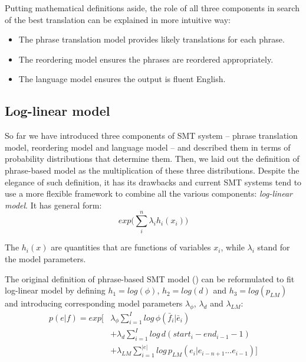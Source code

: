Putting mathematical definitions aside, the role of all three components in search of
the best translation can be explained in more intuitive way:
\begin{itemize}
  \item The phrase translation model provides likely translations for each phrase.
  \item The reordering model ensures the phrases are reordered appropriately.
  \item The language model ensures the output is fluent English.
\end{itemize}


\subsection{Log-linear model}

So far we have introduced three components of SMT system -- phrase translation model,
reordering model and language model -- and described them in terms of probability
distributions that determine them.
Then, we laid out the definition of phrase-based model as the multiplication of these
three distributions.
Despite the elegance of such definition, it has its drawbacks and current SMT
systems tend to use a more flexible framework to combine all the various
components: \emph{log-linear model}.
It has general form:
\begin{equation}
  exp \Big( \sum_i^n \lambda_i h_i(x_i) \Big)
\end{equation}

The $h_i(x)$ are quantities that are functions of variables $x_i$,
while $\lambda_i$ stand for the model parameters.

The original definition of phrase-based SMT model () can be reformulated to
fit log-linear model by defining $h_1 = log(\phi)$, $h_2 = log(d)$ and $h_3 = log(p_{LM})$
and introducing corresponding model parameters $\lambda_{\phi}$, $\lambda_{d}$ and $\lambda_{LM}$:
\begin{equation}
  \begin{aligned}
  p(e|f) = exp \Bigg[ &\lambda_{\phi} \sum_{i=1}^I log \, \phi(\bar{f}_i|\bar{e}_i) \\
       &+ \lambda_{d} \sum_{i=1}^{I} log \, d(start_i - end_{i-1} - 1) \\
       &+ \lambda_{LM} \sum_{i=1}^{|e|} log \, p_{LM}(e_i|e_{i-n+1}...e_{i-1}) \Bigg] \\
  \end{aligned}
\end{equation}


